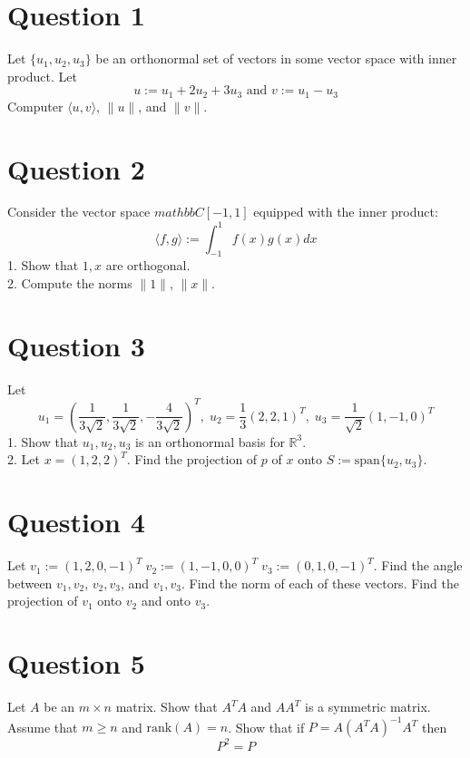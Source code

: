 \documentclass{article}
\begin{document}
\section*{Question 1}
Let $\{u_1, u_2, u_3\}$ be an orthonormal set of vectors in some vector space with inner product.
Let $$ u:= u_1 + 2u_2 + 3u_3 \text{ and } v:= u_1 - u_3 $$
Computer $\langle u, v \rangle$, $\|u\|$, and $\|v\|$.

\section*{Question 2}
Consider the vector space $mathbb{C}[-1, 1]$ equipped with the inner product:
$$ \langle f, g \rangle := \int_{-1}^1 f(x)g(x) dx $$
1. Show that $1, x$ are orthogonal.\\
2. Compute the norms $\|1\|$, $\|x\|$.\\

\section*{Question 3}
Let $$ u_1 = \left( \frac{1}{3\sqrt{2}}, \frac{1}{3\sqrt{2}}, -\frac{4}{3\sqrt{2}}\right)^T, \; u_2 = \frac{1}{3}(2, 2, 1)^T, \; u_3 = \frac{1}{\sqrt{2}}(1, -1, 0)^T $$
1. Show that $u_1, u_2, u_3$ is an orthonormal basis for $\mathbb{R}^3$.\\
2. Let $x=(1, 2, 2)^T$. Find the projection of $p$ of $x$ onto $S := \text{span}\{u_2, u_3\}$.

\section*{Question 4}
Let $v_1 := (1, 2, 0, -1)^T \; v_2 := (1, -1, 0, 0)^T \; v_3 := (0, 1, 0, -1)^T$.
Find the angle between $v_1, v_2$, $v_2, v_3$, and $v_1, v_3$.
Find the norm of each of these vectors.
Find the projection of $v_1$ onto $v_2$ and onto $v_3$.

\section*{Question 5}
Let $A$ be an $m \times n$ matrix. Show that $A^T A$ and $AA^T$ is a symmetric matrix.
Assume that $m \geq n$ and $\text{rank}(A) = n$.
Show that if $P=A(A^T A)^{-1}A^T$ then $$ P^2 = P $$
\end{document}
